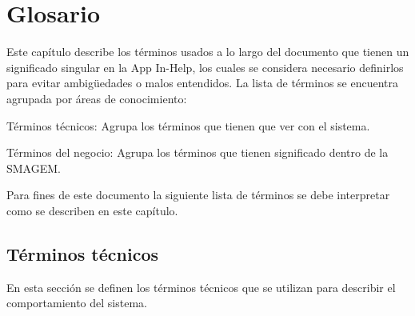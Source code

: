 \section{Glosario}
\label{sec:glosario}
    Este capítulo describe los términos usados a lo largo del documento que tienen un significado singular en la App In-Help, los cuales se considera necesario definirlos para evitar ambigüedades o malos entendidos.
    La lista de términos se encuentra agrupada por áreas de conocimiento:
\begin{Citemize}
    \item Términos técnicos: Agrupa los términos que tienen que ver con el sistema.
    \item Términos del negocio: Agrupa los términos que tienen significado dentro de la SMAGEM.
\end{Citemize}

    Para fines de este documento la siguiente lista de términos se debe interpretar como se describen en este capítulo.

   
\subsection{Términos técnicos}
\label{gls:terminosTecnicos}

  En esta sección se definen los términos técnicos que se utilizan para describir el comportamiento del sistema.
  
